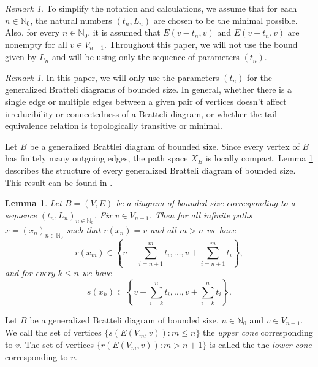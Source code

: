 \documentclass[11pt, twoside]{amsart}
\theoremstyle{definition}
\theoremstyle{remark}
\newtheorem{remark}[definition]{Remark}
\theoremstyle{plain}
\newtheorem{lemma}[definition]{Lemma}
\newcommand{\tcr}{\textcolor{red}}
\newcommand{\N}{\mathbb N}
\numberwithin{equation}{section}
\begin{document}
\begin{remark}
To simplify the notation and calculations, we assume that for each $n \in \N_0$, the natural numbers 
$(t_n, L_n)$ are chosen to be the minimal possible. Also, for every 
$n \in \mathbb{N}_0$, it is assumed that $E(v - t_n, v)$ and 
$E(v + t_n, v)$ are nonempty for all $v \in V_{n+1}$. Throughout this paper, we will not use the bound given by $L_n$ and will be using only the sequence of parameters $(t_n)$.
\end{remark}

\begin{remark}
    In this paper, we will only use the parameters $(t_n)$ for the generalized Bratteli diagrams of bounded size. In general, whether there is a single edge or multiple edges between a given pair of vertices doesn't affect irreducibility or connectedness of a Bratteli diagram, or whether the tail equivalence relation is topologically transitive or minimal. %
\end{remark}

Let $B$ be a generalized Brattlei diagram of bounded size. Since every vertex of $B$ has finitely many outgoing edges, the path space $X_B$ is locally compact. Lemma \ref{lemma_bdd_size_cone}  describes the structure of every generalized Bratteli diagram of bounded size. This result can be found in \cite[Section 3.1]{BezuglyiJorgensenKarpelSanadhya2025}.

\begin{lemma}\cite{BezuglyiJorgensenKarpelSanadhya2025}\label{lemma_bdd_size_cone} Let $B=(V,E)$ be a 
diagram of bounded size corresponding to a sequence 
$(t_n, L_n)_{n \in \N_0}$. Fix $v \in V_{n+1}$. Then 
for all infinite paths $x = 
(x_n)_{n\in \N_0}$ such that $r(x_n) = v$ and all $m > n$ we have
\begin{equation}\label{formula_bdd_size_lower_cone}
r(x_{m}) \in \left\{v - \sum_{i = n+1}^{m} t_{i}, \ldots, v + 
\sum_{i = n+1}^{m} t_{i}\right\},
\end{equation}
and for 
every $k \leq n$ we have 
$$
s(x_k) \subset \left\{v - \sum_{i = k}^{n} t_i, \ldots, v + 
\sum_{i = k}^n t_i\right\}.
$$
\end{lemma}

Let $B$ be a generalized Bratteli diagram of bounded size, $n \in \N_0$ and $v \in V_{n+1}$. We call the set of vertices $\{s(E(V_m, v)): m \leq n\}$ the \textit{upper cone} corresponding to $v$. The set of vertices $\{r(E(V_m, v)): m > n+1\}$ is called the the \textit{lower cone} corresponding to $v$.
\end{document}
